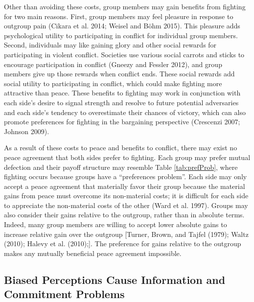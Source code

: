 \documentclass[11pt]{article}
\begin{document}
Other than avoiding these costs, group members may gain benefits from
fighting for two main reasons. First, group members may feel pleasure in
response to outgroup pain (Cikara et al. 2014; Weisel and Böhm 2015).
This pleasure adds psychological utility to participating in conflict
for individual group members. Second, individuals may like gaining glory
and other social rewards for participating in violent conflict.
Societies use various social carrots and sticks to encourage
participation in conflict (Gneezy and Fessler 2012), and group members
give up those rewards when conflict ends. These social rewards add
social utility to participating in conflict, which could make fighting
more attractive than peace. These benefits to fighting may work in
conjunction with each side's desire to signal strength and resolve to
future potential adversaries and each side's tendency to overestimate
their chances of victory, which can also promote preferences for
fighting in the bargaining perspective (Crescenzi 2007; Johnson 2009).

As a result of these costs to peace and benefits to conflict, there may
exist no peace agreement that both sides prefer to fighting. Each group
may prefer mutual defection and their payoff structure may resemble
Table \ref{tab:prefProb}, where fighting occurs because groups have a
``preferences problem''. Each side may only accept a peace agreement
that materially favor their group because the material gains from peace
must overcome its non-material costs; it is difficult for each side to
appreciate the non-material costs of the other (Ward et al. 1997).
Groups may also consider their gains relative to the outgroup, rather
than in absolute terms. Indeed, many group members are willing to accept
lower absolute gains to increase relative gain over the outgroup
{[}Turner, Brown, and Tajfel (1979); Waltz (2010); Halevy et al.
(2010);{]}. The preference for gains relative to the outgroup makes any
mutually beneficial peace agreement impossible.

\hypertarget{biased-perceptions-cause-information-and-commitment-problems}{%
\subsection{Biased Perceptions Cause Information and Commitment
Problems}\label{biased-perceptions-cause-information-and-commitment-problems}}
\end{document}

